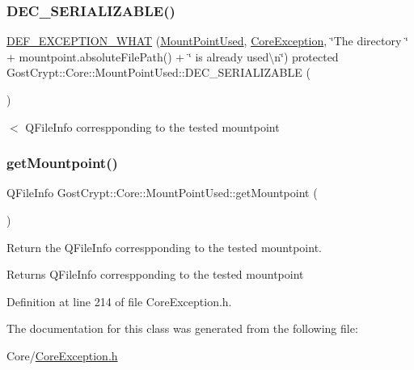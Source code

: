 \subsubsection{\texorpdfstring{D\+E\+C\+\_\+\+S\+E\+R\+I\+A\+L\+I\+Z\+A\+B\+L\+E()}{DEC\_SERIALIZABLE()}}
{\footnotesize\ttfamily \hyperlink{_gost_crypt_exception_8h_a5bc1e1c6c9d6f46c84eeba49e33355f9}{D\+E\+F\+\_\+\+E\+X\+C\+E\+P\+T\+I\+O\+N\+\_\+\+W\+H\+AT} (\hyperlink{class_gost_crypt_1_1_core_1_1_mount_point_used}{Mount\+Point\+Used}, \hyperlink{class_gost_crypt_1_1_core_1_1_core_exception}{Core\+Exception}, \char`\"{}The directory \char`\"{} + mountpoint.\+absolute\+File\+Path() + \char`\"{} is already used\textbackslash{}n\char`\"{}) protected Gost\+Crypt\+::\+Core\+::\+Mount\+Point\+Used\+::\+D\+E\+C\+\_\+\+S\+E\+R\+I\+A\+L\+I\+Z\+A\+B\+LE (\begin{DoxyParamCaption}\item[{\hyperlink{class_gost_crypt_1_1_core_1_1_mount_point_used}{Mount\+Point\+Used}}]{ }\end{DoxyParamCaption})}

$<$ Q\+File\+Info correspponding to the tested mountpoint \mbox{\label{class_gost_crypt_1_1_core_1_1_mount_point_used_a97471ef44eec2ae56c802f45447235f4}} 
\subsubsection{\texorpdfstring{get\+Mountpoint()}{getMountpoint()}}
{\footnotesize\ttfamily Q\+File\+Info Gost\+Crypt\+::\+Core\+::\+Mount\+Point\+Used\+::get\+Mountpoint (\begin{DoxyParamCaption}{ }\end{DoxyParamCaption})\hspace{0.3cm}{\ttfamily [inline]}}



Return the Q\+File\+Info correspponding to the tested mountpoint. 

\begin{DoxyReturn}{Returns}
Q\+File\+Info correspponding to the tested mountpoint 
\end{DoxyReturn}


Definition at line 214 of file Core\+Exception.\+h.



The documentation for this class was generated from the following file\+:\begin{DoxyCompactItemize}
\item 
Core/\hyperlink{_core_exception_8h}{Core\+Exception.\+h}\end{DoxyCompactItemize}
